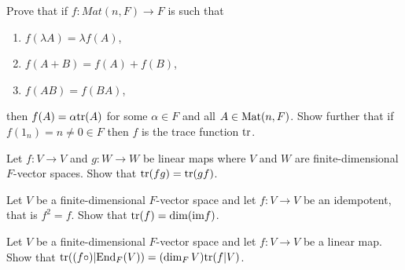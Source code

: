     Prove that if $f : Mat(n, F) \to F$ is such that
    \begin{enumerate}
    \item $f(\lambda A) = \lambda f(A)$,
    \item $f(A + B) = f(A) + f(B)$,
    \item $f(AB) = f(BA)$,
    \end{enumerate}
    then $f(A) = \alpha \text{tr}(A)$ for some $\alpha \in F$ and all $A \in \text{Mat}(n, F)$. Show further that if $f(1_n) = n \ne 0 \in F$ then $f$ is the trace function $\text{tr}$.
    
  \item Let $f : V \to V$ and $g : W \to W$ be linear maps where $V$ and $W$ are finite-dimensional $F$-vector spaces. Show that $\text{tr}(fg) = \text{tr}(gf)$.
  \item Let $V$ be a finite-dimensional $F$-vector space and let $f : V \to V$ be an idempotent, that is $f^2 = f$. Show that $\text{tr}(f) = \dim(\text{im} f)$.
  \item Let $V$ be a finite-dimensional $F$-vector space and let $f : V \to V$ be a linear map. Show that $\text{tr}((f \circ) | \text{End}_F(V)) = (\dim_F V) \text{tr}(f | V)$.